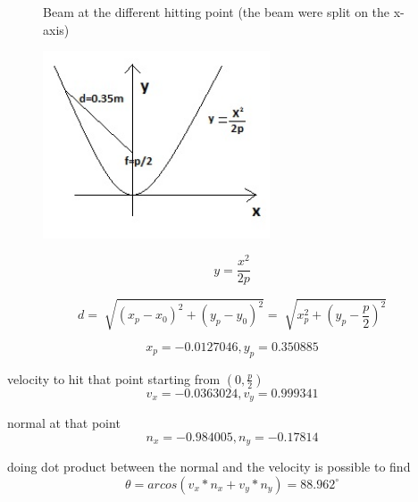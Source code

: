 \documentclass[a4paper]{article}
\begin{document}
\begin{figure}[H]
    \caption{Beam at the different hitting point (the beam were split on the x-axis)}

\end{figure}


\newpage
\newpage
{}

\begin{figure}[H]
\centering
\includegraphics[width=0.6\textwidth]{pparabola.jpg}
\end{figure}

\begin{equation*}
y=\frac{x^2}{2p}
\end{equation*}

\begin{equation*}
d=\sqrt[]{(x_p-x_0)^2+(y_p-y_0)^2}=\sqrt[]{x_p^2+(y_p-\frac{p}{2})^2}
\end{equation*}

\begin{equation*}
x_p=-0.0127046, y_p=0.350885
\end{equation*}

velocity to hit that point starting from $(0, \frac{p}{2})$
\begin{equation*}
v_x=-0.0363024, v_y=0.999341
\end{equation*}

normal at that point
\begin{equation*}
n_x=-0.984005, n_y=-0.17814
\end{equation*}

doing dot product between the normal and the velocity is possible to find
\begin{equation*} 
\theta=arcos(v_x*n_x+v_y*n_y)=88.962^\circ
\end{equation*}

\cite{baudoin:1998:impara-latex-e-mettilo}



\end{document}
